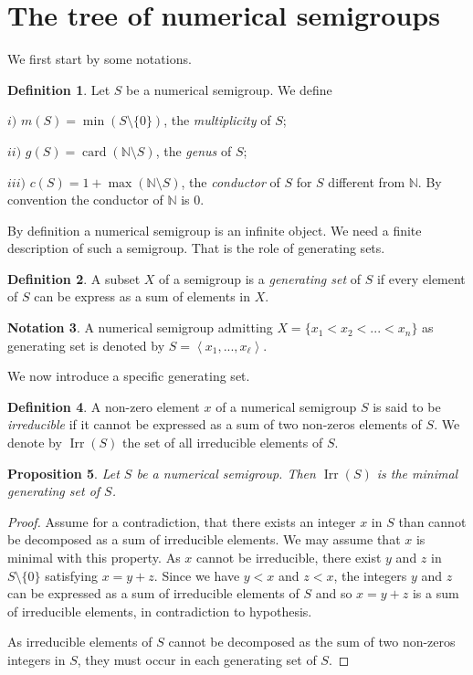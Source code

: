 \documentclass[reqno,11pt]{amsart}
\theoremstyle{plain}
\newtheorem{prop}{Proposition}[section]
\theoremstyle{definition}
\newtheorem{defi}[prop]{Definition}
\newtheorem{nota}[prop]{Notation}
\newcommand{\NN}{\mathbb{N}}
\DeclareMathOperator{\Irr}{Irr}
\DeclareMathOperator{\card}{card}
\begin{document}
\section{The tree of numerical semigroups}
\label{S:Tree}
We first start by some notations.

\begin{defi}
Let $S$ be a numerical semigroup. We define 

$i)$ $m(S)=\min(S\setminus\{0\})$, the \emph{multiplicity} of $S$;

$ii)$ $g(S)=\card(\NN\setminus S)$, the \emph{genus} of $S$;

$iii)$ $c(S)=1+\max(\NN\setminus S)$, the \emph{conductor} of $S$ for $S$ different from $\NN$. By convention the conductor of $\NN$ is $0$. 
\end{defi}

By definition a numerical semigroup is an infinite object. 
We need a finite description of such a semigroup. 
That is the role of generating sets.


\begin{defi}
A subset $X$ of a semigroup is a \emph{generating set} of $S$ if every element of $S$ can be express as a sum of elements in $X$. 
\end{defi}


\begin{nota}
A numerical semigroup admitting $X=\{x_1<x_2<...<x_n\}$ as generating set is denoted  by $S=\left<x_1,...,x_\ell\right>$.
\end{nota}

We now introduce a specific generating set.

\begin{defi}
A non-zero element $x$ of a numerical semigroup $S$ is said to be \emph{irreducible} if it cannot be expressed as a sum of two non-zeros elements of $S$.  
We denote by $\Irr(S)$ the set of all irreducible elements of $S$.
\end{defi}


\begin{prop}
Let $S$ be a numerical semigroup.
Then $\Irr(S)$ is the minimal generating set of $S$.
\end{prop} 

\begin{proof}
Assume for a contradiction, that there exists an integer  $x$ in $S$ than cannot be decomposed as a sum of irreducible elements. 
We may assume that $x$ is  minimal with this property. 
As  $x$ cannot be irreducible, there exist $y$ and $z$ in~$S\setminus\{0\}$ satisfying $x=y+z$. 
Since we have $y<x$ and $z<x$, the integers $y$ and $z$ can be expressed as a sum of irreducible elements of $S$ and so $x=y+z$ is a sum of irreducible elements, in contradiction to hypothesis. 

As irreducible elements of $S$ cannot be decomposed as the sum of two non-zeros integers in $S$, they must occur in each generating set of $S$.
\end{proof}
\end{document}
